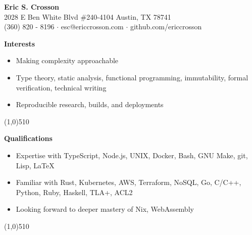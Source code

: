 \documentclass{report}
\newcommand{\cut}{\begin{center} \line(1,0){510} \end{center}}
\begin{document}
\pagestyle{empty}
\setlength\parindent{0pt}

\begin{center}
  \textbf{Eric S. Crosson} \\
  2028 E Ben White Blvd \#240-4104 Austin, TX 78741 \\
  (360) 820 - 8196 $\cdot$ esc@ericcrosson.com $\cdot$ github.com/ericcrosson
\end{center}

\textbf{Interests}
\begin{itemize}[label=$\cdot$]
\item Making complexity approachable
\item Type theory, static analysis, functional programming, immutability, formal verification, technical writing
\item Reproducible research, builds, and deployments
\end{itemize}

\cut{}

\textbf{Qualifications}
\begin{itemize}[label=$\cdot$]
\item Expertise with TypeScript, Node.js, UNIX, Docker, Bash, GNU Make, git, Lisp, \LaTeX{}
\item Familiar with Rust, Kubernetes, AWS, Terraform, NoSQL, Go, C/C++, Python, Ruby, Haskell, TLA+, ACL2
\item Looking forward to deeper mastery of Nix, WebAssembly
\end{itemize}

\cut{}
\end{document}
